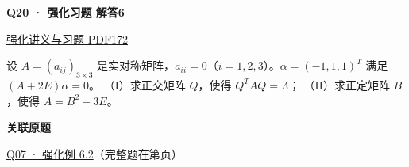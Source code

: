 \documentclass[UTF8,fontset=fandol,11pt,a4paper]{ctexart}
\newcommand{\source}[1]{{\footnotesize\color{Muted}#1\par}}
\newcommand{\qtitle}[2]{\par\needspace{5\baselineskip}\hypertarget{#1}{}\label{#1}\textbf{#2}\par}
\begin{document}
\begin{minipage}{\linewidth}
\qtitle{R-LONG-06}{Q20 · 强化习题 解答6}
\source{\href{file:///Users/skyintelligence/Desktop/\%E5\%BE\%97\%E8\%AF\%BB\%E4\%B8\%AA\%E7\%A0\%94-\%E5\%8C\%97\%E5\%A4\%A7\%E8\%BD\%AF\%E5\%BE\%AE/\%E6\%95\%B0\%E5\%AD\%A6\%20150/Kira\%C2\%B727\%E7\%BA\%BF\%E6\%80\%A7\%E4\%BB\%A3\%E6\%95\%B0\%E5\%BC\%BA\%E5\%8C\%96\%E8\%AE\%B2\%E4\%B9\%89\%2B\%E4\%B9\%A0\%E9\%A2\%98.pdf\#page=172}{强化讲义与习题 PDF172}}
设 $A=(a_{ij})_{3\times3}$ 是实对称矩阵，$a_{ii}=0$（$i=1,2,3$）。$\alpha=(-1,1,1)^T$ 满足 $(A+2E)\alpha=0$。
（I）求正交矩阵 $Q$，使得 $Q^TAQ=\Lambda$；
（II）求正定矩阵 $B$，使得 $A=B^2-3E$。
\end{minipage}\par\vspace{7mm}
\textbf{关联原题}\par
\hyperlink{R-EX-02}{Q07 · 强化例 6.2}（完整题在第\pageref*{R-EX-02}页）\par
\clearpage
\end{document}

